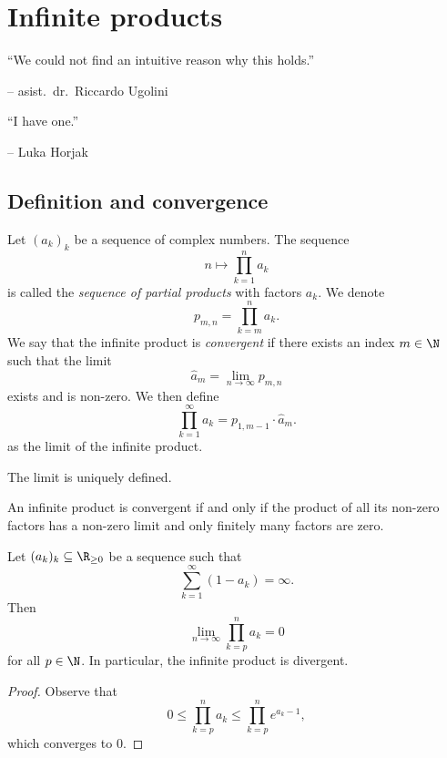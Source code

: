 \section{Infinite products}

\epigraph{``We could not find an intuitive reason why this
holds.''}{-- asist.~dr.~Riccardo Ugolini}
\vspace{-\baselineskip}
\epigraph{``I have one.''}{-- Luka Horjak}

\subsection{Definition and convergence}

\begin{definicija}
Let $(a_k)_k$ be a sequence of complex numbers. The sequence
\[
n \mapsto \prod_{k=1}^n a_k
\]
is called the
\emph{sequence of partial products} with
factors $a_k$. We denote
\[
p_{m,n} = \prod_{k=m}^n a_k.
\]
We say that the infinite product is \emph{convergent} if there
exists an index $m \in \N$ such that the limit
\[
\widehat{a}_m = \lim_{n \to \infty} p_{m,n}
\]
exists and is non-zero. We then define
\[
\prod_{k=1}^\infty a_k = p_{1, m-1} \cdot  \widehat{a}_m.
\]
as the limit of the infinite product.
\end{definicija}

\begin{opomba}
The limit is uniquely defined.
\end{opomba}

\begin{opomba}
An infinite product is convergent if and only if the product of all
its non-zero factors has a non-zero limit and only finitely many
factors are zero.
\end{opomba}


\begin{lema}
Let $(a_k)_k \subseteq \R_{\geq 0}$ be a sequence such that
\[
\sum_{k=1}^\infty (1 - a_k) = \infty.
\]
Then
\[
\lim_{n \to \infty} \prod_{k=p}^n a_k = 0
\]
for all $p \in \N$. In particular, the infinite product is
divergent.
\end{lema}

\begin{proof}
Observe that
\[
0 \leq
\prod_{k=p}^n a_k \leq
\prod_{k=p}^n e^{a_k - 1},
\]
which converges to $0$.
\end{proof}

